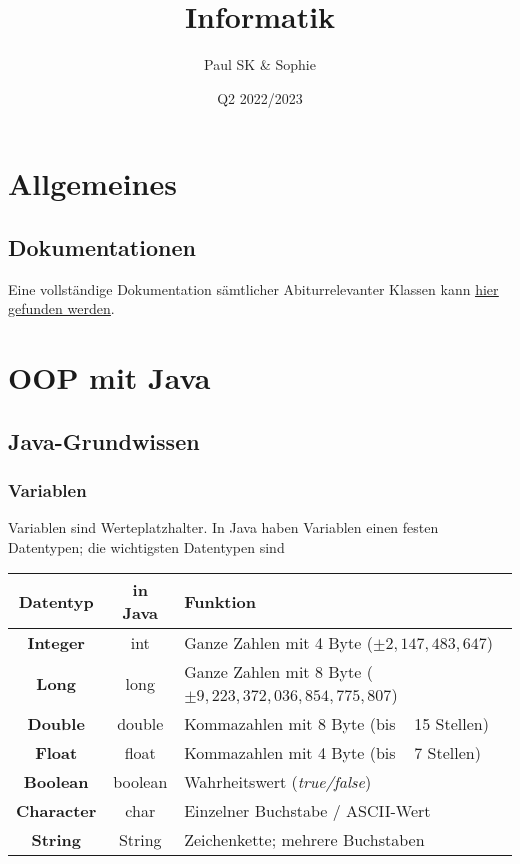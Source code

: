 \documentclass{article}
\title{Informatik}
\date{Q2 2022/2023}
\author{Paul SK \& Sophie}
\begin{document}
	\maketitle
	\newpage


	\section{Allgemeines}
	\subsection{Dokumentationen}
	Eine vollständige Dokumentation sämtlicher Abiturrelevanter Klassen kann \href{https://www.schulentwicklung.nrw.de/lehrplaene/upload/klp\_SII/if/Dokumentation\_ZA-IF\_GK-LK\_ab\_2018\_2021\_12\_22.pdf}{\underline{hier gefunden werden}}.

	\section{OOP mit Java}
	\subsection{Java-Grundwissen}
	\subsubsection{Variablen}
	Variablen sind Werteplatzhalter. In Java haben Variablen einen festen Datentypen; die wichtigsten Datentypen sind 

	\begin{center}
		\def\arraystretch{1.1}
		\begin{tabular}{ | c | c | l | }
			\hline
			\textbf{Datentyp} 	& \textbf{in Java} 	& \textbf{Funktion} \\
			\hline
			\hline
			\textbf{Integer}	& int				& Ganze Zahlen mit 4 Byte ($\pm 2,147,483,647$) \\
			\textbf{Long}		& long 				& Ganze Zahlen mit 8 Byte ($\pm 9,223,372,036,854,775,807$) \\
			\textbf{Double} 	& double			& Kommazahlen mit 8 Byte (bis ~ 15 Stellen) \\
			\textbf{Float} 		& float 			& Kommazahlen mit 4 Byte (bis ~ 7 Stellen) \\
			\textbf{Boolean}	& boolean			& Wahrheitswert (\textit{true/false}) \\
			\textbf{Character} 	& char 				& Einzelner Buchstabe / ASCII-Wert \\
			\textbf{String} 	& String 			& Zeichenkette; mehrere Buchstaben \\
			\hline
		\end{tabular}
	\end{center}
\end{document}
